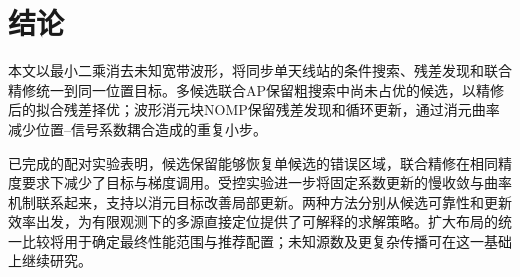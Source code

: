 \section{结论}\label{sec:conclusion}
本文以最小二乘消去未知宽带波形，将同步单天线站的条件搜索、残差发现和联合精修统一到同一位置目标。多候选联合AP保留粗搜索中尚未占优的候选，以精修后的拟合残差择优；波形消元块NOMP保留残差发现和循环更新，通过消元曲率减少位置--信号系数耦合造成的重复小步。

已完成的配对实验表明，候选保留能够恢复单候选的错误区域，联合精修在相同精度要求下减少了目标与梯度调用。受控实验进一步将固定系数更新的慢收敛与曲率机制联系起来，支持以消元目标改善局部更新。两种方法分别从候选可靠性和更新效率出发，为有限观测下的多源直接定位提供了可解释的求解策略。扩大布局的统一比较将用于确定最终性能范围与推荐配置；未知源数及更复杂传播可在这一基础上继续研究。
